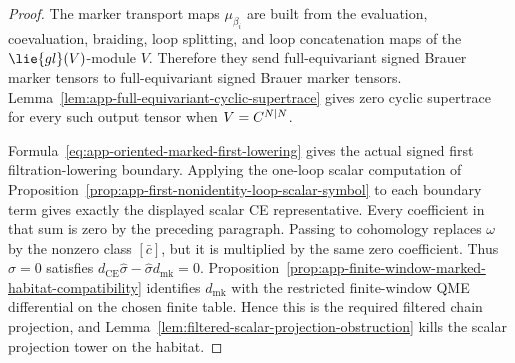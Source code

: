 \begin{proof}
  The marker transport maps \(\mu_{\beta_i}\) are built from the
  evaluation, coevaluation, braiding, loop splitting, and loop
  concatenation maps of the \(\lie{gl}(V)\)-module \(V\).  Therefore they
  send full-equivariant signed Brauer marker tensors to full-equivariant
  signed Brauer marker tensors.  Lemma~\ref{lem:app-full-equivariant-cyclic-supertrace}
  gives zero cyclic supertrace for every such output tensor when
  \(V=C^{N|N}\).

  Formula~\eqref{eq:app-oriented-marked-first-lowering} gives the actual
  signed first filtration-lowering boundary.  Applying the one-loop
  scalar computation of
  Proposition~\ref{prop:app-first-nonidentity-loop-scalar-symbol} to each
  boundary term gives exactly the displayed scalar CE representative.
  Every coefficient in that sum is zero by the preceding paragraph.
  Passing to cohomology replaces \(\omega\) by the nonzero class
  \([\bar c]\), but it is multiplied by the same zero coefficient.  Thus
  \(\widehat\sigma=0\) satisfies
  \(d_{\mathrm{CE}}\widehat\sigma-\widehat\sigma d_{\mathrm{mk}}=0\).
  Proposition~\ref{prop:app-finite-window-marked-habitat-compatibility}
  identifies \(d_{\mathrm{mk}}\) with the restricted finite-window QME
  differential on the chosen finite table.  Hence this is the required
  filtered chain projection, and
  Lemma~\ref{lem:filtered-scalar-projection-obstruction} kills the scalar
  projection tower on the habitat.
\end{proof}

